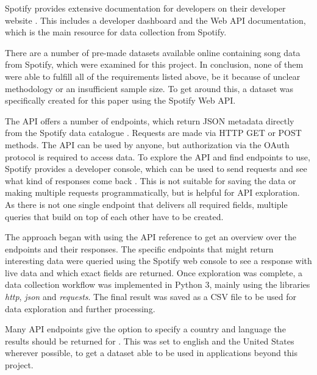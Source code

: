 Spotify provides extensive documentation for developers on their developer website \cite{SpotifyDev}.
This includes a developer dashboard and the Web API documentation, which is the main resource
for data collection from Spotify.

There are a number of pre-made datasets available online containing song data from Spotify,
which were examined for this project. In conclusion, none of them were able to fulfill
all of the requirements listed above, be it because of unclear methodology or an insufficient sample size.
To get around this, a dataset was specifically created for this paper using the Spotify Web API.

The \ac{API} offers a number of endpoints, which return \ac{JSON} metadata
directly from the Spotify data catalogue \cite{SpotifyWebAPI}.
Requests are made via HTTP GET or POST methods.
The \ac{API} can be used by anyone, but authorization via the OAuth protocol is required to access data.
To explore the \ac{API} and find endpoints to use, Spotify provides a developer console, which can be used to 
send requests and see what kind of responses come back \cite{SpotifyDevConsole}. This is not suitable for saving the data or making multiple
requests programmatically, but is helpful for API exploration. As there is not one single endpoint that delivers all
required fields, multiple queries that build on top of each other have to be created.

The approach began with using the \ac{API} reference to get an overview over the endpoints and their responses.
The specific endpoints that might return interesting data were queried using the Spotify web console to see
a response with live data and which exact fields are returned.
Once exploration was complete, a data collection workflow was implemented in Python 3, mainly using the
libraries \emph{http}, \emph{json} and \emph{requests}. The final result was saved as a CSV file to be used for data exploration
and further processing.

Many API endpoints give the option to specify a country and language the results should be returned for \cite{SpotifyAPIRef}.
This was set to english and the United States wherever possible, to get a dataset able to be used
in applications beyond this project.

